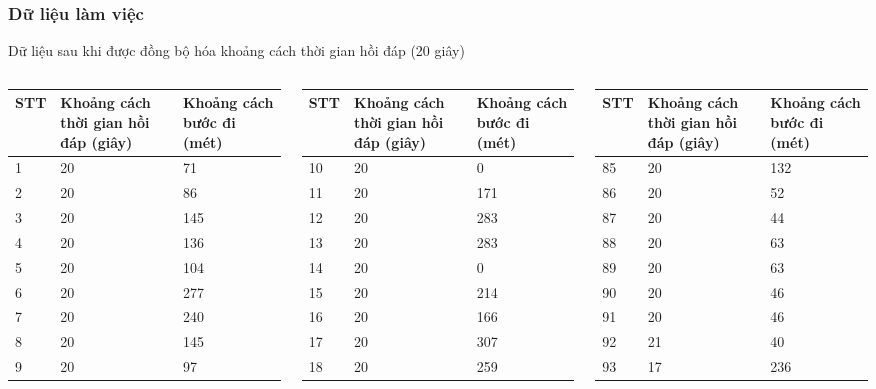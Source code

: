 \documentclass{beamer}
\begin{document}

\begin{frame}[t]
\frametitle{Dữ liệu làm việc}Dữ liệu sau khi được đồng bộ hóa khoảng cách thời gian hồi đáp (20 giây)\\
\begin{columns}[T] %
\begin{column}{.3\textwidth}
\begin{tabular}{ |l|p{1cm}|p{1cm}| }
\hline
STT&Khoảng cách thời gian hồi đáp (giây) & Khoảng cách bước đi (mét)\\
\hline
\hline
1&20&71\\
\hline
2&20& 86\\
\hline
3&20& 145\\
\hline
4&20& 136\\
\hline
5&20& 104\\
\hline
6&20& 277\\
\hline
7&20& 240\\
\hline
8&20& 145\\
\hline
9&20& 97\\
\hline
\end{tabular}
\end{column}%
\hfill%
\begin{column}{.3\textwidth}
\begin{tabular}{ |l|p{1cm}|p{1cm}| }
\hline
STT&Khoảng cách thời gian hồi đáp (giây) & Khoảng cách bước đi (mét)\\
\hline
\hline
10&20& 0\\
\hline
11&20& 171\\
\hline
12&20& 283\\
\hline
13&20& 283\\
\hline
14&20& 0\\
\hline
15&20& 214\\
\hline
16&20& 166\\
\hline
17&20& 307\\
\hline
18&20& 259\\
\hline
\end{tabular}
\end{column}%
\hfill%
\begin{column}{.3\textwidth}
\begin{tabular}{ |l|p{1cm}|p{1cm}| }
\hline
STT&Khoảng cách thời gian hồi đáp (giây) & Khoảng cách bước đi (mét)\\
\hline
\hline
85&20& 132\\
\hline
86&20& 52\\
\hline
87&20& 44\\
\hline
88&20& 63\\
\hline
89&20& 63\\
\hline
90&20& 46\\
\hline
91&20& 46\\
\hline
92&21& 40\\
\hline
93&17& 236\\
\hline
\end{tabular}
\end{column}%
\end{columns}
\end{frame}
\end{document}
